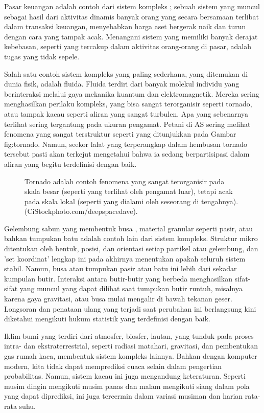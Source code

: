 \documentclass[a4paper,12pt]{book}
\begin{document}
Pasar keuangan adalah contoh dari sistem kompleks \cite{nicolis2007,erdi2008}; sebuah sistem yang muncul sebagai hasil dari aktivitas dinamis banyak orang yang secara bersamaan terlibat dalam transaksi keuangan, menyebabkan harga aset bergerak naik dan turun dengan cara yang tampak acak. Menangani sistem yang memiliki banyak derajat kebebasan, seperti yang tercakup dalam aktivitas orang-orang di pasar, adalah tugas yang tidak sepele.

Salah satu contoh sistem kompleks yang paling sederhana, yang ditemukan di dunia fisik, adalah fluida. Fluida terdiri dari banyak molekul individu yang berinteraksi melalui gaya mekanika kuantum dan elektromagnetik. Mereka sering menghasilkan perilaku kompleks, yang bisa sangat terorganisir seperti tornado, atau tampak kacau seperti aliran yang sangat turbulen. Apa yang sebenarnya terlihat sering tergantung pada ukuran pengamat. Petani di AS sering melihat fenomena yang sangat terstruktur seperti yang ditunjukkan pada Gambar  {fig:tornado}. Namun, seekor lalat yang terperangkap dalam hembusan tornado tersebut pasti akan terkejut mengetahui bahwa ia sedang berpartisipasi dalam aliran yang begitu terdefinisi dengan baik.

\begin{figure}[h]
\centering
\caption{Tornado adalah contoh fenomena yang sangat terorganisir pada skala besar (seperti yang terlihat oleh pengamat luar), tetapi acak pada skala lokal (seperti yang dialami oleh seseorang di tengahnya). (CiStockphoto.com/deepspacedave).}
\label{fig:tornado}
\end{figure}

Gelembung sabun yang membentuk busa \cite{weaire1999, weaire2009}, material granular seperti pasir, atau bahkan tumpukan batu adalah contoh lain dari sistem kompleks. Struktur mikro ditentukan oleh bentuk, posisi, dan orientasi setiap partikel atau gelembung, dan 'set koordinat' lengkap ini pada akhirnya menentukan apakah seluruh sistem stabil. Namun, busa atau tumpukan pasir atau batu ini lebih dari sekadar kumpulan butir. Interaksi antara butir-butir yang berbeda menghasilkan sifat-sifat yang muncul yang dapat dilihat saat tumpukan butir runtuh, misalnya karena gaya gravitasi, atau busa mulai mengalir di bawah tekanan geser. Longsoran dan penataan ulang yang terjadi saat perubahan ini berlangsung kini diketahui mengikuti hukum statistik yang terdefinisi dengan baik.

Iklim bumi yang terdiri dari atmosfer, biosfer, lautan, yang tunduk pada proses intra- dan ekstraterrestrial, seperti radiasi matahari, gravitasi, dan pembentukan gas rumah kaca, membentuk sistem kompleks lainnya. Bahkan dengan komputer modern, kita tidak dapat memprediksi cuaca selain dalam pengertian probabilitas. Namun, sistem kacau ini juga mengandung keteraturan. Seperti musim dingin mengikuti musim panas dan malam mengikuti siang dalam pola yang dapat diprediksi, ini juga tercermin dalam variasi musiman dan harian rata-rata suhu.
\end{document}
